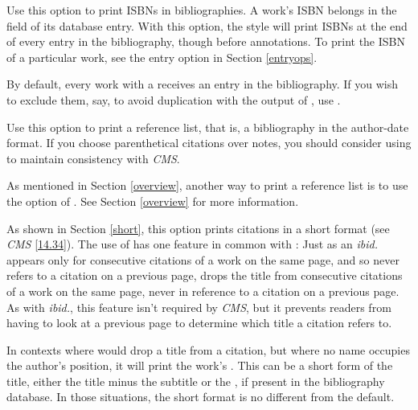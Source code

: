 \documentclass[11pt,letterpaper,oneside]{article}
\begin{document}
\begin{optionlist}

\noindent Use this option to print ISBNs in bibliographies. A work's
ISBN belongs in the  field of its database entry. With
this option, the style will print ISBNs at the end of every entry in
the bibliography, though before annotations. To print the ISBN of a
particular work, see the  entry option in Section
\ref{entryops}.


\noindent By default, every work with a  receives
an entry in the bibliography. If you wish to exclude them, say, to
avoid duplication with the output of , use
.


\noindent Use this option to print a reference list, that is, a
bibliography in the author-date format. If you choose parenthetical
citations over notes, you should consider using  to
maintain consistency with \textit{CMS}.

As mentioned in Section \ref{overview}, another way to print a
reference list is to use the   option of
. See Section \ref{overview} for more
information.


\noindent As shown in Section \ref{short}, this option prints
citations in a short format (see \textit{CMS} \ref{14.34}). The use of
 has one feature in common with : Just as an
\textit{ibid.} appears only for consecutive citations of a work on the
same page, and so never refers to a citation on a previous page,
 drops the title from consecutive citations of a work on
the same page, never in reference to a citation on a previous page. As
with \textit{ibid.}, this feature isn't required by \textit{CMS}, but
it prevents readers from having to look at a previous page to
determine which title a citation refers to.

In contexts where  would drop a title from a citation, but
where no name occupies the author's position, it will print the work's
. This can be a short form of the title, either
the title minus the subtitle or the , if present
in the bibliography database. In those situations, the short format is
no different from the default.


\end{optionlist}
\end{document}
